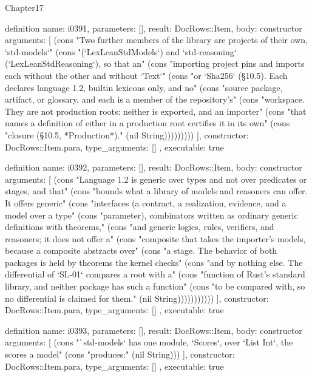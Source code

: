 \begin{lexlean}{Chapter17}
\begin{semanticmodule}
definition{
  name: i0391,
  parameters: [],
  result: DocRows::Item,
  body: constructor{
    arguments: [
      (cons "Two further members of the library are projects of their own, `std-models`" (cons "(`LexLeanStdModels`) and `std-reasoning` (`LexLeanStdReasoning`), so that an" (cons "importing project pins and imports each without the other and without `Text`" (cons "or `Sha256` (§10.5). Each declares language 1.2, builtin lexicons only, and no" (cons "source package, artifact, or glossary, and each is a member of the repository's" (cons "workspace. They are not production roots: neither is exported, and an importer" (cons "that names a definition of either in a production root certifies it in its own" (cons "closure (§10.5, *Production*)." (nil String)))))))))
    ],
    constructor: DocRows::Item.para,
    type_arguments: []
  },
  executable: true
}

definition{
  name: i0392,
  parameters: [],
  result: DocRows::Item,
  body: constructor{
    arguments: [
      (cons "Language 1.2 is generic over types and not over predicates or stages, and that" (cons "bounds what a library of models and reasoners can offer. It offers generic" (cons "interfaces (a contract, a realization, evidence, and a model over a type" (cons "parameter), combinators written as ordinary generic definitions with theorems," (cons "and generic logics, rules, verifiers, and reasoners; it does not offer a" (cons "composite that takes the importer's models, because a composite abstracts over" (cons "a stage. The behavior of both packages is held by theorems the kernel checks" (cons "and by nothing else. The differential of `SL-01` compares a root with a" (cons "function of Rust's standard library, and neither package has such a function" (cons "to be compared with, so no differential is claimed for them." (nil String)))))))))))
    ],
    constructor: DocRows::Item.para,
    type_arguments: []
  },
  executable: true
}

definition{
  name: i0393,
  parameters: [],
  result: DocRows::Item,
  body: constructor{
    arguments: [
      (cons "`std-models` has one module, `Scores`, over `List Int`, the scores a model" (cons "produces:" (nil String)))
    ],
    constructor: DocRows::Item.para,
    type_arguments: []
  },
  executable: true
}


\end{semanticmodule}
\end{lexlean}

